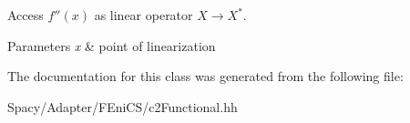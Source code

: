 Access $f''(x)$ as linear operator $X\rightarrow X^*$. 


\begin{DoxyParams}{Parameters}
{\em x} & point of linearization \\
\hline
\end{DoxyParams}


The documentation for this class was generated from the following file\+:\begin{DoxyCompactItemize}
\item 
Spacy/\+Adapter/\+F\+Eni\+C\+S/c2\+Functional.\+hh\end{DoxyCompactItemize}
